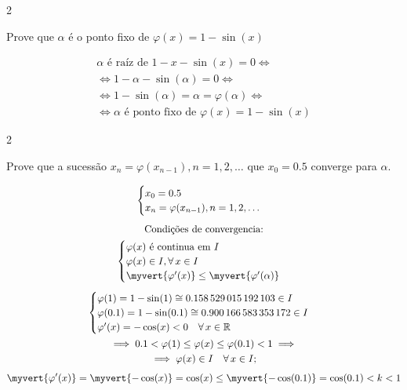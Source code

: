 \documentclass[CN_A-Tests_Resolutions.tex]{subfiles}
\begin{document}
\begin{questionBox}2{} %

  Prove que \(\alpha\) é o ponto fixo de \(\varphi(x)=1-\sin(x)\)

  \answer{}

  \begin{gather*}
    \alpha\text{ é raíz de } 1-x-\sin(x)=0
    \iff \\
    \iff
    1-\alpha-\sin(\alpha)=0
    \iff \\
    \iff
    1-\sin(\alpha)=\alpha=\varphi(\alpha)
    \iff \\
    \iff
    \alpha \text{ é ponto fixo de }
    \varphi(x)=1-\sin(x)
  \end{gather*}

\end{questionBox}

\begin{questionBox}2{} %

  Prove que a sucessão \(x_n=\varphi(x_{n-1}),n=1,2,\dots\text{ que }x_0=0.5\) converge para \(\alpha\).

  \answer{}

  \begin{gather*}
    \begin{cases}
      x_0=0.5
      \\
      x_n=\varphi(x_{n-1}),n=1,2,\dots
    \end{cases}
    \\[1ex]
    \text{Condições de convergencia:}\\
    \begin{cases}
      \varphi(x)\text{ é continua em } I
      \\
      \varphi(x)\in I,\forall\,x\in I
      \\
      \myvert{\varphi'(x)}\leq\myvert{\varphi'(\alpha)}
    \end{cases}
    \\[1ex]
    \begin{cases}
      \varphi(1)=1-\sin(1)
      \cong \num{0.158529015192103}
      \in I
      \\
      \varphi(0.1)=1-\sin(0.1)
      \cong\num{0.900166583353172}
      \in I
      \\
      \varphi'(x)=-\cos(x)<0\quad\forall\,x\in\mathbb{R}
    \end{cases}
    \\
    \implies
    0.1 
    < \varphi(1)
    \leq \varphi(x)
    \leq \varphi(0.1)
    < 1
    \implies \\
    \implies
    \varphi(x)\in I\quad\forall\,x\in I
    ; \\[1ex]
    \myvert{\varphi'(x)}
    =\myvert{-\cos(x)}
    =\cos(x)
    \leq
    \myvert{-\cos(0.1)}
    = \cos(0.1)
    < k < 1
  \end{gather*}

\end{questionBox}
\end{document}
